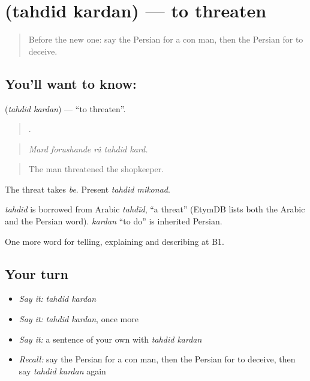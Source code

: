 \section[\texorpdfstring{\fa{تهدید} \fa{کردن} (tahdid kardan)}{تهدید کردن (tahdid kardan)}]{  (tahdid kardan) — to threaten}

\label{lesson:FA-C323-tahdid-kardan}



\begin{quote}
Before the new one: say the Persian for a con man, then the Persian for to deceive.
\end{quote}

\subsection*{You'll want to know:  }
\textbf{ } (\emph{tahdid kardan}) — \textquotedblleft{}to threaten\textquotedblright{}.

\begin{quote}
    .
\end{quote}

\begin{quote}
\emph{Mard forushande râ tahdid kard.}
\end{quote}

\begin{quote}
The man threatened the shopkeeper.
\end{quote}

The threat takes \emph{be}. Present \emph{tahdid mikonad}.

\begin{cousinweb}
\emph{tahdid} is borrowed from Arabic \emph{tahdīd}, \textquotedblleft{}a threat\textquotedblright{} (EtymDB lists both the Arabic and the Persian word). \emph{kardan} \textquotedblleft{}to do\textquotedblright{} is inherited Persian.
\end{cousinweb}

\begin{grammarlens}[title={What you've built}]
One more word for telling, explaining and describing at B1.
\end{grammarlens}

\subsection*{Your turn}
\begin{itemize}
\raggedright
  \item \emph{Say it:} \emph{tahdid kardan}
  \item \emph{Say it:} \emph{tahdid kardan}, once more
  \item \emph{Say it:} a sentence of your own with \emph{tahdid kardan}
  \item \emph{Recall:} say the Persian for a con man, then the Persian for to deceive, then say \emph{tahdid kardan} again
\end{itemize}

